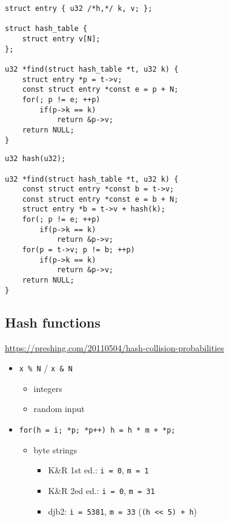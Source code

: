 \begin{multicols}{2}
    \begin{lstlisting}[style=c,xleftmargin=0px,xrightmargin=0px]
struct entry { u32 /*h,*/ k, v; };

struct hash_table {
    struct entry v[N];
};

u32 *find(struct hash_table *t, u32 k) {
    struct entry *p = t->v;
    const struct entry *const e = p + N;
    for(; p != e; ++p)
        if(p->k == k)
            return &p->v;
    return NULL;
}
    \end{lstlisting}
    \columnbreak
    \begin{lstlisting}[style=c,xleftmargin=0px,xrightmargin=0px]
u32 hash(u32);

u32 *find(struct hash_table *t, u32 k) {
    const struct entry *const b = t->v;
    const struct entry *const e = b + N;
    struct entry *b = t->v + hash(k);
    for(; p != e; ++p)
        if(p->k == k)
            return &p->v;
    for(p = t->v; p != b; ++p)
        if(p->k == k)
            return &p->v;
    return NULL;
}
    \end{lstlisting}
\end{multicols}

\subsection{Hash functions}

\url{https://preshing.com/20110504/hash-collision-probabilities}

\begin{itemize}
    \item \texttt{x \% N} / \texttt{x \& N}
        \begin{itemize}
            \item integers
            \item random input
        \end{itemize}
    \item
        \texttt{for(h = i; *p; *p++) h = h * m + *p;}
        \begin{itemize}
            \item byte strings
            \begin{itemize}
                \item K\&R 1st ed.: \texttt{i = 0}, \texttt{m = 1}
                \item K\&R 2ed ed.: \texttt{i = 0}, \texttt{m = 31}
                \item
                    djb2: \texttt{i = 5381}, \texttt{m = 33}
                    (\texttt{(h << 5) + h})
            \end{itemize}
        \end{itemize}
\end{itemize}

